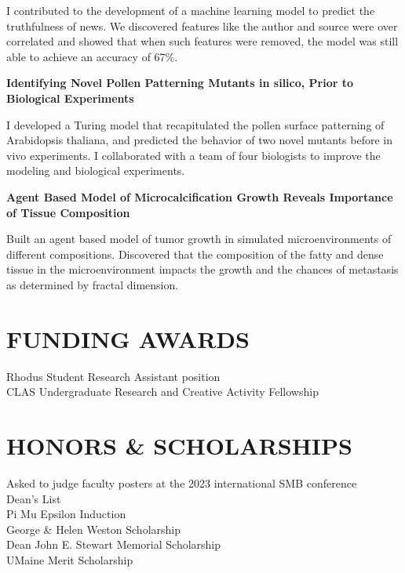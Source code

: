 \documentclass[10pt]{res} %
\begin{document}
\begin{resume}
    I contributed to the development of a machine learning model to     predict the truthfulness of news. 
    We discovered features like the author and source were over correlated and showed that when such features were removed, the model was still able to achieve an accuracy of 67\%.

    {\bf Identifying Novel Pollen Patterning Mutants in silico, Prior to Biological Experiments}

    I developed a Turing model that recapitulated the pollen surface patterning of Arabidopsis thaliana, and predicted the behavior of two novel mutants before in vivo experiments. 
    I collaborated with a team of four biologists to improve the modeling and biological experiments.
    
    {\bf Agent Based Model of Microcalcification Growth Reveals Importance of Tissue Composition}

    Built an agent based model of tumor growth in simulated microenvironments of different compositions. Discovered that the composition of the fatty and dense tissue in the microenvironment impacts the growth and the chances of metastasis as determined by fractal dimension.
 
\section{FUNDING AWARDS}        
    Rhodus Student Research Assistant position \\%
    CLAS Undergraduate Research and Creative Activity Fellowship %

\section{HONORS \& SCHOLARSHIPS}
    Asked to judge faculty posters at the 2023 international SMB conference\\
    Dean's List \\
    Pi Mu Epsilon  Induction\\
    George \& Helen Weston Scholarship\\
    Dean John E. Stewart Memorial Scholarship\\
    UMaine Merit Scholarship
                
 

\end{resume}
\end{document}
